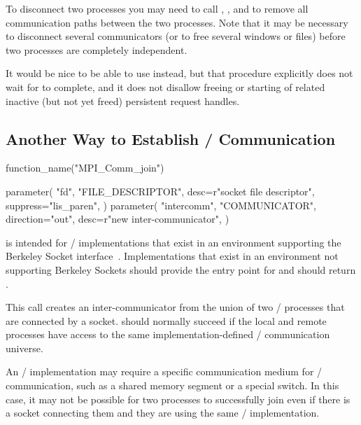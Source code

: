\begin{users}
To disconnect two processes you may need to call
, ,
and  to remove all communication paths
between the two processes.  Note that it may be necessary to
disconnect several communicators (or to free several windows or files)
before two processes are completely independent.
\end{users}

\begin{rationale}
It would be nice to be able to use  instead,
but that procedure explicitly does not wait for
 to complete,
and it does not disallow freeing or starting of related inactive (but not yet freed)
persistent request handles.
\end{rationale}

\subsection{Another Way to Establish \texorpdfstring{\MPI/}{MPI} Communication}

%
\begin{mpi-binding}
    function_name("MPI_Comm_join")

    parameter(
        "fd",
        "FILE_DESCRIPTOR",
        desc=r"socket file descriptor",
        suppress="lis_paren",
    )
    parameter(
        "intercomm",
        "COMMUNICATOR",
        direction="out",
        desc=r"new inter-communicator",
    )
\end{mpi-binding}

 is intended for \MPI/ implementations
that exist in an environment supporting the Berkeley Socket
interface~\cite{sockettutorial,psdbook}.
Implementations that exist in an environment not supporting Berkeley Sockets
should provide the entry point for 
and should return .

This call creates an inter-communicator from the union of two \MPI/
processes that are connected by a socket.
 should normally
succeed if the local and remote processes have access to
the same implementation-defined \MPI/ communication universe.

\begin{users} An \MPI/ implementation may require a specific
communication medium for \MPI/ communication, such as a shared memory
segment or a special switch. In this case, it may not be possible for
two processes to successfully join even if there is a socket
connecting them and they are using the same \MPI/ implementation.
\end{users}

